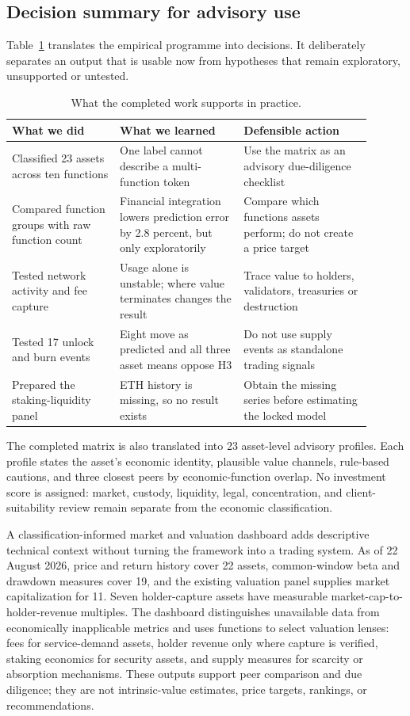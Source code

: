\documentclass[10pt]{article}
\begin{document}
\subsection{Decision summary for advisory use}
Table~\ref{tab:decision-summary} translates the empirical programme into decisions. It deliberately separates an output that is usable now from hypotheses that remain exploratory, unsupported or untested.

\begin{table}[ht]
\centering
\small
\begin{tabular}{p{0.27\linewidth}p{0.31\linewidth}p{0.32\linewidth}}
\toprule
What we did & What we learned & Defensible action \\
\midrule
Classified 23 assets across ten functions & One label cannot describe a multi-function token & Use the matrix as an advisory due-diligence checklist \\
Compared function groups with raw function count & Financial integration lowers prediction error by 2.8 percent, but only exploratorily & Compare which functions assets perform; do not create a price target \\
Tested network activity and fee capture & Usage alone is unstable; where value terminates changes the result & Trace value to holders, validators, treasuries or destruction \\
Tested 17 unlock and burn events & Eight move as predicted and all three asset means oppose H3 & Do not use supply events as standalone trading signals \\
Prepared the staking-liquidity panel & ETH history is missing, so no result exists & Obtain the missing series before estimating the locked model \\
\bottomrule
\end{tabular}
\caption{What the completed work supports in practice.}
\label{tab:decision-summary}
\end{table}

The completed matrix is also translated into 23 asset-level advisory profiles. Each profile states the asset's economic identity, plausible value channels, rule-based cautions, and three closest peers by economic-function overlap. No investment score is assigned: market, custody, liquidity, legal, concentration, and client-suitability review remain separate from the economic classification.

A classification-informed market and valuation dashboard adds descriptive technical context without turning the framework into a trading system. As of 22 August 2026, price and return history cover 22 assets, common-window beta and drawdown measures cover 19, and the existing valuation panel supplies market capitalization for 11. Seven holder-capture assets have measurable market-cap-to-holder-revenue multiples. The dashboard distinguishes unavailable data from economically inapplicable metrics and uses functions to select valuation lenses: fees for service-demand assets, holder revenue only where capture is verified, staking economics for security assets, and supply measures for scarcity or absorption mechanisms. These outputs support peer comparison and due diligence; they are not intrinsic-value estimates, price targets, rankings, or recommendations.
\end{document}
